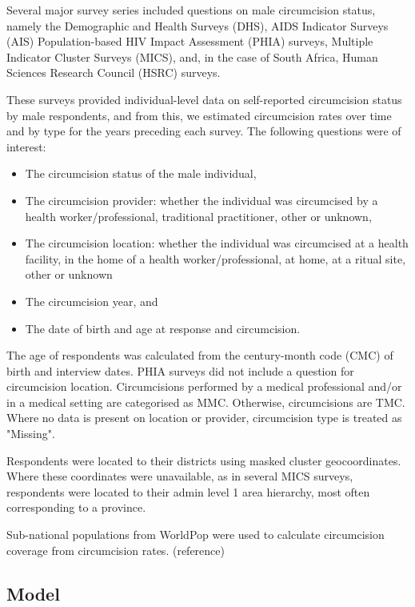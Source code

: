 \documentclass{article}
\begin{document}
{\color{red} Several major survey series included questions on male circumcision status, namely the Demographic and Health Surveys (DHS), AIDS Indicator Surveys (AIS) Population-based HIV Impact Assessment (PHIA) surveys, Multiple Indicator Cluster Surveys (MICS), and, in the case of South Africa, Human Sciences Research Council (HSRC) surveys.

These surveys provided individual-level data on self-reported circumcision status by male respondents, and from this, we estimated circumcision rates over time and by type for the years preceding each survey. The following questions were of interest:
\begin{itemize}
\item The circumcision status of the male individual,
\item The circumcision provider: whether the individual was circumcised by a health worker/professional, traditional practitioner, other or unknown,
\item The circumcision location: whether the individual was circumcised at a health facility, in the home of a health worker/professional, at home, at a ritual site, other or unknown
\item The circumcision year, and
\item The date of birth and age at response and circumcision.
\end{itemize}

The age of respondents was calculated from the century-month code (CMC) of birth and interview dates.
PHIA surveys did not include a question for circumcision location. Circumcisions performed by a medical professional and/or in a medical setting are categorised as MMC. Otherwise, circumcisions are TMC. Where no data is present on location or provider, circumcision type is treated as "Missing". 

Respondents were located to their districts using masked cluster geocoordinates. Where these coordinates were unavailable, as in several MICS surveys, respondents were located to their admin level 1 area hierarchy, most often corresponding to a province. 

Sub-national populations from WorldPop were used to calculate circumcision coverage from circumcision rates. (reference)}


\subsection{Model}
\label{sec:org681dda6}
\end{document}
